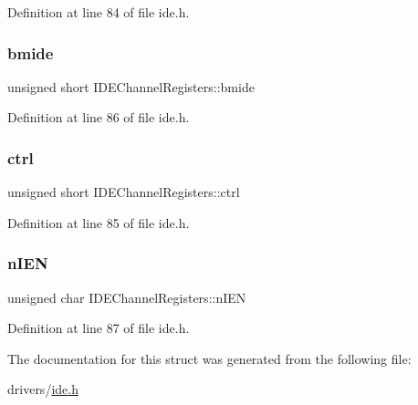Definition at line 84 of file ide.\+h.

\mbox{\label{structIDEChannelRegisters_a037009656fd72b00bdd5aacd92a22f18_a037009656fd72b00bdd5aacd92a22f18}} 
\subsubsection{\texorpdfstring{bmide}{bmide}}
{\footnotesize\ttfamily unsigned short I\+D\+E\+Channel\+Registers\+::bmide}



Definition at line 86 of file ide.\+h.

\mbox{\label{structIDEChannelRegisters_aff63cdf64356750ad0c564fc7d6cd7b9_aff63cdf64356750ad0c564fc7d6cd7b9}} 
\subsubsection{\texorpdfstring{ctrl}{ctrl}}
{\footnotesize\ttfamily unsigned short I\+D\+E\+Channel\+Registers\+::ctrl}



Definition at line 85 of file ide.\+h.

\mbox{\label{structIDEChannelRegisters_a23340aa271745fba054e2c26cf7b9a90_a23340aa271745fba054e2c26cf7b9a90}} 
\subsubsection{\texorpdfstring{n\+I\+EN}{nIEN}}
{\footnotesize\ttfamily unsigned char I\+D\+E\+Channel\+Registers\+::n\+I\+EN}



Definition at line 87 of file ide.\+h.



The documentation for this struct was generated from the following file\+:\begin{DoxyCompactItemize}
\item 
drivers/\hyperlink{ide_8h}{ide.\+h}\end{DoxyCompactItemize}

